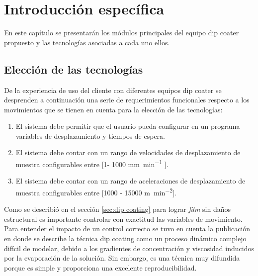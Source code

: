 
\chapter{Introducción específica} %

\label{Chapter2} %

En este capítulo se presentarán los módulos principales del equipo dip coater propuesto y las tecnologías asociadas a cada uno ellos. 
\section{Elección de las tecnologías}

De la experiencia de uso del cliente con diferentes equipos dip coater se desprenden a continuación una serie de requerimientos funcionales respecto a los movimientos que se tienen en cuenta para la elección de las tecnologías: 

\begin{enumerate}
			\item El sistema debe permitir que el usuario pueda configurar en un programa variables de desplazamiento y tiempos de espera.
			\item El sistema debe contar con un rango de velocidades de desplazamiento de muestra configurables entre [1- 1000 \si{\milli\meter\per\minute} ]. 
			\item El sistema debe contar con un rango de aceleraciones de desplazamiento de muestra configurables entre [1000 - 15000 \si{\meter\per\square\minute}].
		
\end{enumerate}
	
Como se describió en el sección \ref{sec:dip coating} para lograr \textit{film} sin daños estructural es importante controlar con exactitud las variables de movimiento. Para entender el impacto de un control correcto se tuvo en cuenta la publicación \cite{paper_galo}  en donde se describe la técnica dip coating como un proceso dinámico complejo difícil de modelar, debido a los gradientes de concentración y viscosidad inducidos por la evaporación de la solución. Sin embargo, es una técnica muy difundida porque es simple y proporciona una excelente reproducibilidad. 

